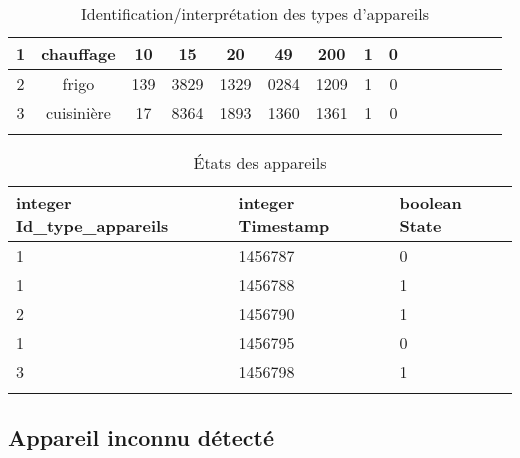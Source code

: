 \documentclass[10pt,a4paper]{article}
\begin{document}
\begin{table}[h]
{\begin{tabular}{|c|c|c|c|c|c|c|c|c|c|c|c|c|c|c|}
1 & chauffage & 10 & 15 & 20 & 49 & 200 & 1 & 0 &  &  &  &  &  &  \\ \hline
2 & frigo & 139 & 3829 & 1329 & 0284 & 1209 & 1 & 0 &  &  &  &  &  &  \\ \hline
3 & cuisinière & 17 & 8364 & 1893 & 1360 & 1361 & 1 & 0  &  &  &  &  &  &  \\ \hline
 &  &  &  &  &  &  &  &  &  &  &  &  &  & 
\end{tabular}
}
\caption{Identification/interprétation des types d'appareils}
\end{table}
\begin{table}[h!]
\centering
    \begin{tabular}{|l|l|l|}
    \hline
    \rowcolor[HTML]{EFEFEF} 
    integer Id\_type\_appareils & integer Timestamp & boolean State \\ \hline
    1       & 1456787           & 0             \\ \hline
    1       & 1456788           & 1             \\ \hline
    2       & 1456790           & 1             \\ \hline
    1       & 1456795           & 0             \\ \hline
    3       & 1456798           & 1             \\ \hline
                 &                   &              
    \end{tabular}
    \caption{États des appareils}
\end{table} 

\newpage
\subsection{Appareil inconnu détecté}
\end{document}
